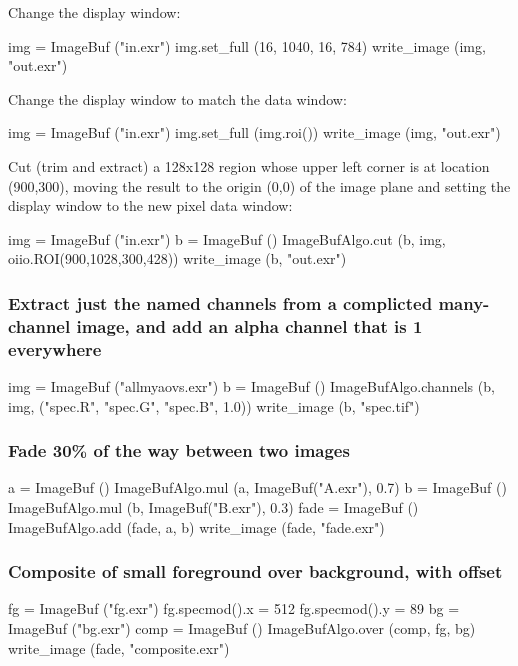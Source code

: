 \noindent Change the display window:
\begin{code}
    img = ImageBuf ("in.exr")
    img.set_full (16, 1040, 16, 784)
    write_image (img, "out.exr")
\end{code}

\noindent Change the display window to match the data window:
\begin{code}
    img = ImageBuf ("in.exr")
    img.set_full (img.roi())
    write_image (img, "out.exr")
\end{code}

\noindent Cut (trim and extract) a 128x128 region whose upper left corner
is at location (900,300), moving the result to the origin (0,0) of the image
plane and setting the display window to the new pixel data window:
\begin{code}
    img = ImageBuf ("in.exr")
    b = ImageBuf ()
    ImageBufAlgo.cut (b, img, oiio.ROI(900,1028,300,428))
    write_image (b, "out.exr")
\end{code}


\subsubsection*{Extract just the named channels from a complicted many-channel
image, and add an alpha channel that is 1 everywhere}
\begin{code}
    img = ImageBuf ("allmyaovs.exr")
    b = ImageBuf ()
    ImageBufAlgo.channels (b, img, ("spec.R", "spec.G", "spec.B", 1.0))
    write_image (b, "spec.tif")
\end{code}


\subsubsection*{Fade 30\% of the way between two images}

\begin{code}
    a = ImageBuf ()
    ImageBufAlgo.mul (a, ImageBuf("A.exr"), 0.7)
    b = ImageBuf ()
    ImageBufAlgo.mul (b, ImageBuf("B.exr"), 0.3)
    fade = ImageBuf ()
    ImageBufAlgo.add (fade, a, b)
    write_image (fade, "fade.exr")
\end{code}


\subsubsection*{Composite of small foreground over background, with offset}

\begin{code}
    fg = ImageBuf ("fg.exr")
    fg.specmod().x = 512
    fg.specmod().y = 89
    bg = ImageBuf ("bg.exr")
    comp = ImageBuf ()
    ImageBufAlgo.over (comp, fg, bg)
    write_image (fade, "composite.exr")
\end{code}





\chapwidthend
